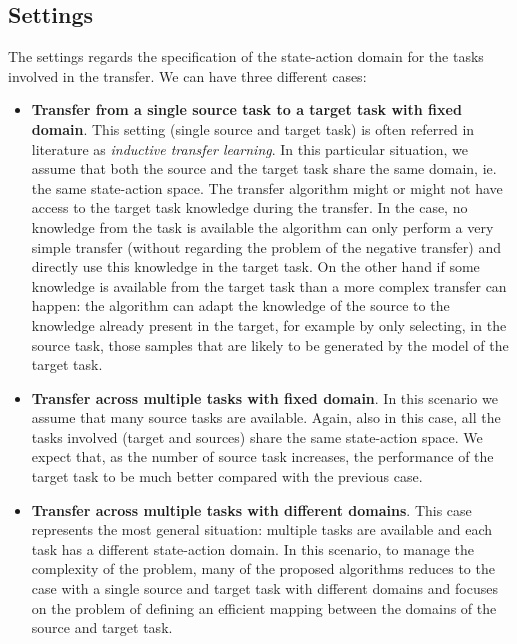     \subsection{Settings}
      \noindent The settings regards the specification of the state-action domain for the tasks involved in
      the transfer. We can have three different cases:
      \begin{itemize}
        \item \textbf{Transfer from a single source task to a target task with fixed domain}. This
        setting (single source and target task) is often referred in literature as \textit{inductive transfer learning}.
        In this particular situation, we assume that both the source and the target task share the same domain, ie.
        the same state-action space. The transfer algorithm might or might not have access to the target task knowledge
        during the transfer. In the case, no knowledge from the task is available the algorithm can only
        perform a very simple transfer (without regarding the problem of the negative transfer) and directly use
        this knowledge in the target task. On the other hand if some knowledge is available from the target
        task than a more complex transfer can happen: the algorithm can adapt the knowledge of the source
        to the knowledge already present in the target, for example by only selecting, in the source task,
        those samples that are likely to be generated by the model of the target task.

        \item \textbf{Transfer across multiple tasks with fixed domain}. In this scenario we assume that many source tasks are
        available. Again, also in this case, all the tasks involved (target and sources) share the same state-action space.
        We expect that, as the number of source task increases, the performance of the target task to be much
        better compared with the previous case.

        \item \textbf{Transfer across multiple tasks with different domains}. This case represents the most general
        situation: multiple tasks are available and each task has a different state-action domain. In this scenario,
        to manage the complexity of the problem, many of the proposed algorithms reduces to the case with a single
        source and target task with different domains and focuses on the problem of defining an efficient mapping
        between the domains of the source and target task.
      \end{itemize}

